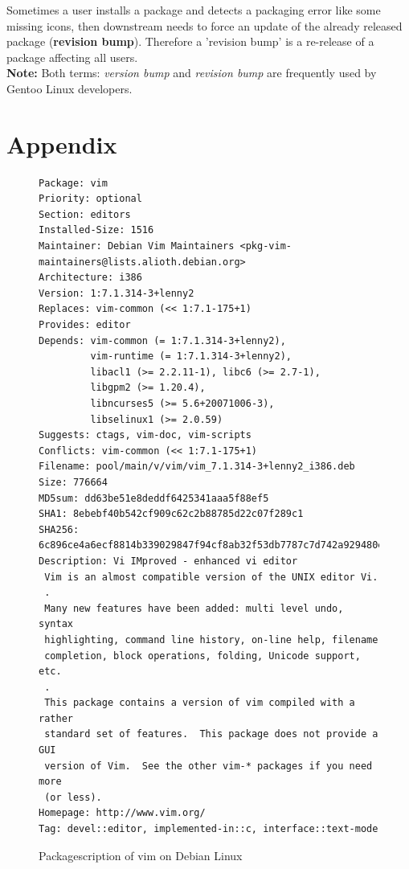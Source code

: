 \documentclass[a4paper,10pt]{article}
\begin{document}
Sometimes a user installs a package and detects a packaging error like some missing icons, then downstream needs to force an update of the already released package (\textbf{revision bump}). Therefore a 'revision bump' is a re-release of a package affecting all users. \\

\textbf{Note:} Both terms: \textit{version bump} and \textit{revision bump} are frequently used by Gentoo Linux developers.


\newpage
\section*{Appendix}
\begin{appendix} 

\begin{figure}[h]
\caption[Kurzeintrag]{Packagescription of vim on Debian Linux}
\label{fig:PackagescriptionDebian}
\begin{verbatim}
Package: vim
Priority: optional
Section: editors
Installed-Size: 1516
Maintainer: Debian Vim Maintainers <pkg-vim-maintainers@lists.alioth.debian.org>
Architecture: i386
Version: 1:7.1.314-3+lenny2
Replaces: vim-common (<< 1:7.1-175+1)
Provides: editor
Depends: vim-common (= 1:7.1.314-3+lenny2), 
         vim-runtime (= 1:7.1.314-3+lenny2), 
         libacl1 (>= 2.2.11-1), libc6 (>= 2.7-1), 
         libgpm2 (>= 1.20.4), 
         libncurses5 (>= 5.6+20071006-3), 
         libselinux1 (>= 2.0.59)
Suggests: ctags, vim-doc, vim-scripts
Conflicts: vim-common (<< 1:7.1-175+1)
Filename: pool/main/v/vim/vim_7.1.314-3+lenny2_i386.deb
Size: 776664
MD5sum: dd63be51e8deddf6425341aaa5f88ef5
SHA1: 8ebebf40b542cf909c62c2b88785d22c07f289c1
SHA256: 6c896ce4a6ecf8814b339029847f94cf8ab32f53db7787c7d742a929480e228b
Description: Vi IMproved - enhanced vi editor
 Vim is an almost compatible version of the UNIX editor Vi.
 .
 Many new features have been added: multi level undo, syntax
 highlighting, command line history, on-line help, filename
 completion, block operations, folding, Unicode support, etc.
 .
 This package contains a version of vim compiled with a rather
 standard set of features.  This package does not provide a GUI
 version of Vim.  See the other vim-* packages if you need more
 (or less).
Homepage: http://www.vim.org/
Tag: devel::editor, implemented-in::c, interface::text-mode
\end{verbatim}
\end{figure}






\end{appendix}
\end{document}
